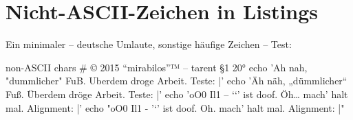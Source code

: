 \documentclass{tarentanleitung}
\begin{document}
\section{Nicht-ASCII-Zeichen in Listings}

\begin{minipage}{\textwidth}
Ein minimaler – deutsche Umlaute, sonstige häufige Zeichen – Test:

\begin{lstdump}[language=sh]{non-ASCII chars}
# © 2015 “mirabilos”™ -- tarent §1 20°
echo 'Ah nah, "dummlicher" FuB. Uberdem droge Arbeit. Teste: |'
echo 'Äh näh, „dümmlicher“ Fuß. Überdem dröge Arbeit. Teste: |'
echo 'oO0 Il1 – ‘`’ ist doof. Öh… mach’ halt mal. Alignment: |'
echo "oO0 Il1 - '`' ist doof. Oh. mach' halt mal. Alignment: |"
\end{lstdump}
\end{minipage}
\end{document}
